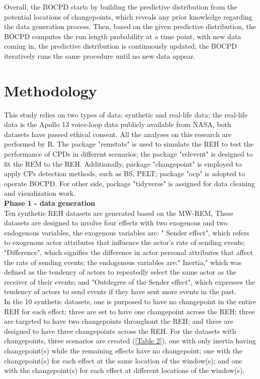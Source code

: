 \documentclass[]{interact}
\theoremstyle{plain}%
\theoremstyle{definition}
\theoremstyle{remark}
\begin{document}
{	Overall, the BOCPD starts by building the predictive distribution from the potential locations of changepoints, which reveals any prior knowledge regarding the data generation process. Then, based on the given predictive distribution, the BOCPD computes the run length probability at a time point, with new data coming in, the predictive distribution is continuously updated, the BOCPD iteratively runs the same procedure until no new data appear. \\
	
	\section{\fontsize{14}{15}\selectfont Methodology}
	
	\hspace{0.2cm} This study relies on two types of data: synthetic and real-life data; the real-life data is the Apollo 13 voice-loop data publicly available from NASA, both datasets have passed ethical consent. All the analyses on this research are performed by R. The package "remstats" is used to simulate the REH to test the performance of CPDs in different scenarios; the package "relevent" is designed to fit the REM to the REH. Additionally, package "changepoint" is employed to apply CPs detection methods, such as BS, PELT; package "ocp" is adopted to operate BOCPD. For other side, package "tidyverse" is assigned for data cleaning and visualization work.\\
	
	\hspace{-0.55cm} \textbf{Phase 1 - data generation}\\
	
	Ten synthetic REH datasets are generated based on the MW-REM, These datasets are designed to involve four effects with two exogenous and two endogenous variables, the exogenous variables are: " Sender effect", which refers to exogenous actor attributes that influence the actor's rate of sending events; "Difference", which signifies the difference in actor personal attributes that affect the rate of sending events; the endogenous variables are:" Inertia," which was defined as the tendency of actors to repeatedly select the same actor as the receiver of their events; and "Outdegree of the Sender effect", which expresses the tendency of actors to send events if they have sent more events in the past. \\
	
	In the 10 synthetic datasets, one is purposed to have no changepoint in the entire REH for each effect; three are set to have one changepoint across the REH; three are targeted to have two changepoints throughout the REH; and three are designed to have three changepoints across the REH. For the datasets with changepoints, three scenarios are created (\autoref{Table 2}), one with only inertia having changepoint(s) while the remaining effects have no changepoint; one with the changepoint(s) for each effect at the same location of the window(s); and one with the changepoint(s) for each effect at different locations of the window(s). \\
	
}
\end{document}
